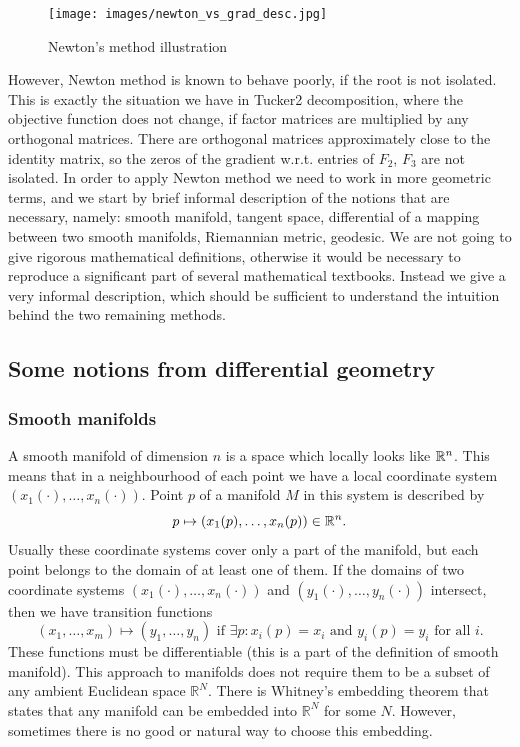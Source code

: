 \begin{figure}
        \centering
                \texttt{[image: images/newton\_vs\_grad\_desc.jpg]}
        \caption{Newton's method illustration}
        \label{fig:newt_grad_comp}
\end{figure}


However, Newton method is known to behave poorly, if the root is not isolated.
This is exactly the situation we have in Tucker2 decomposition, where the objective function
does not change, if factor matrices are multiplied by any orthogonal matrices. 
There are orthogonal matrices approximately close to the identity matrix, so the zeros
of the gradient w.r.t. entries of $F_2$, $F_3$ are not isolated. In order to apply Newton method
we need to work in more geometric terms, and we start by brief informal description of the notions
that are necessary, namely: smooth manifold, tangent space, differential of a mapping between two smooth manifolds,
Riemannian metric, geodesic.
We are not going to give 
rigorous mathematical definitions, otherwise it would be necessary
to reproduce a significant part of several mathematical textbooks.
Instead we give a very informal description, which should be sufficient
to understand the intuition behind the two remaining methods.


\subsection{Some notions from differential geometry}
\subsubsection{Smooth manifolds}
A smooth manifold of dimension $n$ is a space which locally 
looks like $\mathbb{R}^n$. 
This means that in a neighbourhood of each point we have a local coordinate system $(x_1(\cdot), \dots,  x_n(\cdot))$.
Point $p$ of a manifold $M$ in this system is described by 
\begin{equation}
p \mapsto (x_1(p), \dots, x_n(p)) \in \mathbb{R}^n. 
\end{equation}
Usually these coordinate systems  cover only a part of the manifold, but each point belongs to the domain
of at least one of them.
If the domains of two coordinate systems $(x_1(\cdot), \dots, x_n(\cdot))$
and $(y_1(\cdot), \dots, y_n(\cdot))$ intersect, then we have transition functions
\begin{equation}
(x_1, \dots, x_m) \mapsto (y_1, \dots, y_n) \mbox{ if } \exists p : x_i(p) = x_i \mbox{ and } y_i(p) = y_i \mbox{ for all } i.
\end{equation}
These functions must be differentiable (this is a part of the definition of smooth manifold).
This approach to manifolds does not require them to be a subset of 
any ambient Euclidean space $\mathbb{R}^N$. There is Whitney's embedding theorem 
that states that any manifold can be embedded into $\mathbb{R}^N$
for some $N$. However, sometimes there is no good or natural way to choose this embedding.

